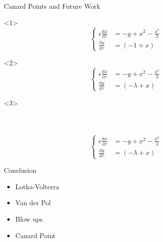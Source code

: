 \documentclass[11pt]{beamer}
\newcommand{\dif}{\mathrm{d}}
\begin{document}
\begin{frame}{Canard Points and Future Work}
\begin{onlyenv}<1>
\begin{equation*} 
        \begin{cases}
        \epsilon\frac{\dif x}{\dif \tau} &= -y + x^2 - \frac{x^3}{3}\\ 
        \frac{\dif y}{\dif \tau}&= (-1+x)
        \end{cases}
        \end{equation*}
\end{onlyenv}

\begin{onlyenv}<2>
    \begin{equation*}
         \begin{cases}
        \epsilon\frac{\dif x}{\dif \tau} &= -y + x^2 - \frac{x^3}{3}\\ 
        \frac{\dif y}{\dif \tau}&= (-\lambda+x)
        \end{cases}
        \end{equation*}
\end{onlyenv}

\begin{onlyenv}<3>
\begin{columns}
\begin{figure}
    \centering
{}

\end{figure}
\begin{figure}
    \centering
{}
\end{figure}
 

\end{columns}
\begin{equation*} 
        \begin{cases}
        \epsilon\frac{\dif x}{\dif \tau} &= -y + x^2 - \frac{x^3}{3}\\ 
        \frac{\dif y}{\dif \tau}&= (-\lambda+x)
        \end{cases}
        \end{equation*}
\end{onlyenv}
\end{frame}

\begin{frame}{Conclusion}
\begin{itemize}
    \item Lotka-Volterra 
    \item Van der Pol 
    \item Blow ups 
    \item Canard Point
\end{itemize}
\end{frame}
\end{document}

